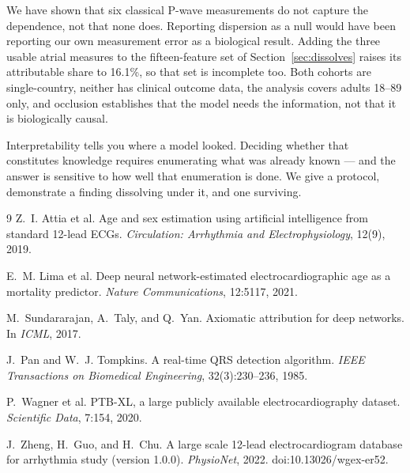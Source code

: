\documentclass{article}
\begin{document}
We have shown that six classical P-wave measurements do not capture the
dependence, not that none does. Reporting dispersion as a null would have been
reporting our own measurement error as a biological result. Adding the three
usable atrial measures to the fifteen-feature set of Section~\ref{sec:dissolves}
raises its attributable share to 16.1\%, so that set is incomplete
too. Both cohorts are single-country, neither has clinical outcome data, the
analysis covers adults 18--89 only, and occlusion establishes that the model
needs the information, not that it is biologically causal.

Interpretability tells you where a model looked. Deciding whether that
constitutes knowledge requires enumerating what was already known --- and the
answer is sensitive to how well that enumeration is done. We give a protocol,
demonstrate a finding dissolving under it, and one surviving.


\begin{thebibliography}{9}
\small
{}
Z.~I. Attia et al.
\newblock Age and sex estimation using artificial intelligence from standard
12-lead ECGs.
\newblock \emph{Circulation: Arrhythmia and Electrophysiology}, 12(9), 2019.

E.~M. Lima et al.
\newblock Deep neural network-estimated electrocardiographic age as a mortality
predictor.
\newblock \emph{Nature Communications}, 12:5117, 2021.

M.~Sundararajan, A.~Taly, and Q.~Yan.
\newblock Axiomatic attribution for deep networks.
\newblock In \emph{ICML}, 2017.

J.~Pan and W.~J. Tompkins.
\newblock A real-time QRS detection algorithm.
\newblock \emph{IEEE Transactions on Biomedical Engineering}, 32(3):230--236, 1985.

P.~Wagner et al.
\newblock PTB-XL, a large publicly available electrocardiography dataset.
\newblock \emph{Scientific Data}, 7:154, 2020.

J.~Zheng, H.~Guo, and H.~Chu.
\newblock A large scale 12-lead electrocardiogram database for arrhythmia study
(version 1.0.0).
\newblock \emph{PhysioNet}, 2022. doi:10.13026/wgex-er52.
\end{thebibliography}
\end{document}

